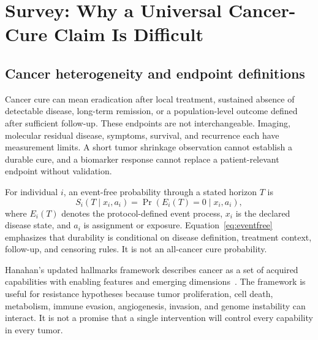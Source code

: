 \documentclass[10pt,conference]{IEEEtran}
\begin{document}
\section{Survey: Why a Universal Cancer-Cure Claim Is Difficult}\label{sec:survey}
\subsection{Cancer heterogeneity and endpoint definitions}
Cancer cure can mean eradication after local treatment, sustained absence of detectable disease, long-term remission, or a population-level outcome defined after sufficient follow-up. These endpoints are not interchangeable. Imaging, molecular residual disease, symptoms, survival, and recurrence each have measurement limits. A short tumor shrinkage observation cannot establish a durable cure, and a biomarker response cannot replace a patient-relevant endpoint without validation.

For individual $i$, an event-free probability through a stated horizon $T$ is
\begin{equation}
S_i(T\mid x_i,a_i)=\Pr(E_i(T)=0\mid x_i,a_i),\label{eq:eventfree}
\end{equation}
where $E_i(T)$ denotes the protocol-defined event process, $x_i$ is the declared disease state, and $a_i$ is assignment or exposure. Equation~\eqref{eq:eventfree} emphasizes that durability is conditional on disease definition, treatment context, follow-up, and censoring rules. It is not an all-cancer cure probability.

Hanahan's updated hallmarks framework describes cancer as a set of acquired capabilities with enabling features and emerging dimensions~\cite{hanahan2022}. The framework is useful for resistance hypotheses because tumor proliferation, cell death, metabolism, immune evasion, angiogenesis, invasion, and genome instability can interact. It is not a promise that a single intervention will control every capability in every tumor.
\end{document}
